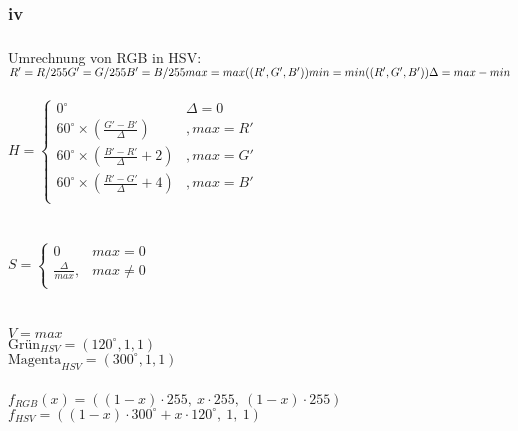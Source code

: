 \documentclass[a4paper,10pt,DIV=14]{article}
\begin{document}
\subsubsection{iv}
\subsubsection{}

Umrechnung von RGB in HSV: \\
\newline
$
R' = R/255\\
G' = G/255\\
B' = B/255\\
max = max((R', G', B'))\\
min = min((R', G', B'))\\
\Delta = max - min
$\\~\\
$
H = \begin{cases}
0^\circ &\Delta = 0\\
60^\circ \times (\frac{G'-B'}{\Delta}) &, max = R'\\
60^\circ \times (\frac{B'-R'}{\Delta}+2) &, max = G'\\
60^\circ \times (\frac{R'-G'}{\Delta}+4) &, max = B'\\
\end{cases}
$\\~\\~\\
$
S = \begin{cases}
0 & max = 0\\
\frac{\Delta}{max}, &max \neq 0\\
\end{cases}
$\\~\\~\\
$
V = max
$\\

$
\text{Grün}_{HSV} = (120^\circ, 1, 1)
$\\
$
\text{Magenta}_{HSV} = (300^\circ, 1, 1)
$

\subsubsection{}

$
f_{RGB}(x) = ((1-x)\cdot255, \ x\cdot255, \ (1-x)\cdot255)
$\\
$
f_{HSV} = ((1-x)\cdot300^\circ + x\cdot 120^\circ, \ 1, \ 1)
$

\subsubsection{}
\end{document}
